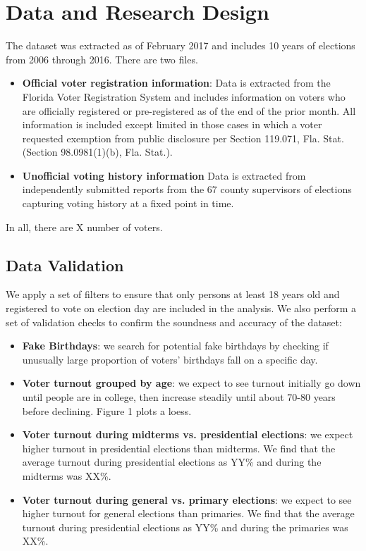 \documentclass[12pt, letterpaper]{article}
\begin{document}
\section{Data and Research Design}
The dataset was extracted as of February 2017 and includes 10 years of elections from 2006 through 2016. There are two files.

\begin{itemize}
	\item \textbf{Official voter registration information}: Data is extracted from the Florida Voter Registration System and includes information on voters who are officially registered or pre-registered as of the end of the prior month. All information is included except limited in those cases in which a voter requested exemption from public disclosure per Section 119.071, Fla. Stat.  (Section 98.0981(1)(b), Fla. Stat.).

	\item \textbf{Unofficial voting history information} Data is extracted from independently submitted reports from the 67 county supervisors of elections capturing voting history at a fixed point in time. 
\end{itemize}

In all, there are X number of voters. 

\subsection{Data Validation}

We apply a set of filters to ensure that only persons at least 18 years old and registered to vote on election day are included in the analysis. We also perform a set of validation checks to confirm the soundness and accuracy of the dataset: 

\begin{itemize}

	\item \textbf{Fake Birthdays}: we search for potential fake birthdays by checking if unusually large proportion of voters' birthdays fall on a specific day.

	\item \textbf{Voter turnout grouped by age}: we expect to see turnout initially go down until people are in college, then increase steadily until about 70-80 years before declining. Figure 1 plots a loess.  

	\item \textbf{Voter turnout during midterms vs. presidential elections}: we expect higher turnout in presidential elections than midterms. We find that the average turnout during presidential elections as YY\% and during the midterms was XX\%. 

	\item \textbf{Voter turnout during general vs. primary elections}: we expect to see higher turnout for general elections than primaries. We find that the average turnout during presidential elections as YY\% and during the primaries was XX\%. 

\end{itemize}
\end{document}

